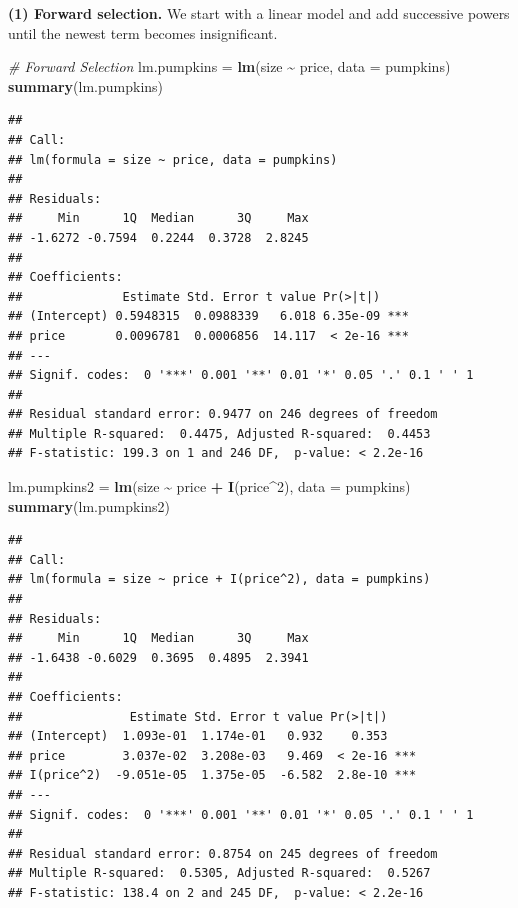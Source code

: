 \documentclass[
]{book}
\newenvironment{Shaded}{\begin{snugshade}}{\end{snugshade}}
\newcommand{\AttributeTok}[1]{\textcolor[rgb]{0.13,0.29,0.53}{#1}}
\newcommand{\CommentTok}[1]{\textcolor[rgb]{0.56,0.35,0.01}{\textit{#1}}}
\newcommand{\DecValTok}[1]{\textcolor[rgb]{0.00,0.00,0.81}{#1}}
\newcommand{\FunctionTok}[1]{\textcolor[rgb]{0.13,0.29,0.53}{\textbf{#1}}}
\newcommand{\NormalTok}[1]{#1}
\newcommand{\OtherTok}[1]{\textcolor[rgb]{0.56,0.35,0.01}{#1}}
\newcommand{\SpecialCharTok}[1]{\textcolor[rgb]{0.81,0.36,0.00}{\textbf{#1}}}
\begin{document}
\textbf{(1) Forward selection.}
We start with a linear model and add successive powers until the newest term becomes insignificant.

\begin{Shaded}
\begin{Highlighting}[]
\CommentTok{\# Forward Selection}
\NormalTok{lm.pumpkins }\OtherTok{=} \FunctionTok{lm}\NormalTok{(size }\SpecialCharTok{\textasciitilde{}}\NormalTok{ price, }\AttributeTok{data =}\NormalTok{ pumpkins)}
\FunctionTok{summary}\NormalTok{(lm.pumpkins)}
\end{Highlighting}
\end{Shaded}

\begin{verbatim}
## 
## Call:
## lm(formula = size ~ price, data = pumpkins)
## 
## Residuals:
##     Min      1Q  Median      3Q     Max 
## -1.6272 -0.7594  0.2244  0.3728  2.8245 
## 
## Coefficients:
##              Estimate Std. Error t value Pr(>|t|)    
## (Intercept) 0.5948315  0.0988339   6.018 6.35e-09 ***
## price       0.0096781  0.0006856  14.117  < 2e-16 ***
## ---
## Signif. codes:  0 '***' 0.001 '**' 0.01 '*' 0.05 '.' 0.1 ' ' 1
## 
## Residual standard error: 0.9477 on 246 degrees of freedom
## Multiple R-squared:  0.4475, Adjusted R-squared:  0.4453 
## F-statistic: 199.3 on 1 and 246 DF,  p-value: < 2.2e-16
\end{verbatim}

\begin{Shaded}
\begin{Highlighting}[]
\NormalTok{lm.pumpkins2 }\OtherTok{=} \FunctionTok{lm}\NormalTok{(size }\SpecialCharTok{\textasciitilde{}}\NormalTok{ price }\SpecialCharTok{+} \FunctionTok{I}\NormalTok{(price}\SpecialCharTok{\^{}}\DecValTok{2}\NormalTok{), }\AttributeTok{data =}\NormalTok{ pumpkins)}
\FunctionTok{summary}\NormalTok{(lm.pumpkins2)}
\end{Highlighting}
\end{Shaded}

\begin{verbatim}
## 
## Call:
## lm(formula = size ~ price + I(price^2), data = pumpkins)
## 
## Residuals:
##     Min      1Q  Median      3Q     Max 
## -1.6438 -0.6029  0.3695  0.4895  2.3941 
## 
## Coefficients:
##               Estimate Std. Error t value Pr(>|t|)    
## (Intercept)  1.093e-01  1.174e-01   0.932    0.353    
## price        3.037e-02  3.208e-03   9.469  < 2e-16 ***
## I(price^2)  -9.051e-05  1.375e-05  -6.582  2.8e-10 ***
## ---
## Signif. codes:  0 '***' 0.001 '**' 0.01 '*' 0.05 '.' 0.1 ' ' 1
## 
## Residual standard error: 0.8754 on 245 degrees of freedom
## Multiple R-squared:  0.5305, Adjusted R-squared:  0.5267 
## F-statistic: 138.4 on 2 and 245 DF,  p-value: < 2.2e-16
\end{verbatim}
\end{document}
